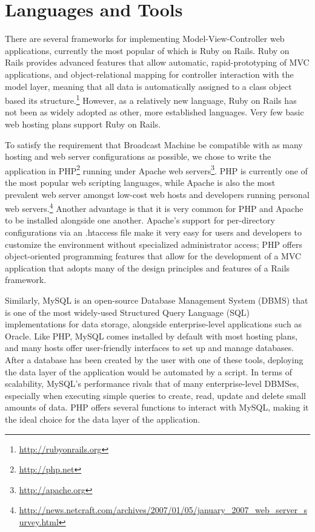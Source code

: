 \documentclass[a4paper,12pt]{report}
\begin{document}
\section{Languages and Tools}
There are several frameworks for implementing Model-View-Controller web applications, currently the most popular of which is Ruby on Rails. Ruby on Rails provides advanced features that allow automatic, rapid-prototyping of MVC applications, and object-relational mapping for controller interaction with the model layer, meaning that all data is automatically assigned to a class object based its structure.\footnote{\url{http://rubyonrails.org}} However, as a relatively new language, Ruby on Rails has not been as widely adopted as other, more established languages. Very few basic web hosting plans support Ruby on Rails. 

To satisfy the requirement that Broadcast Machine be compatible with as many hosting and web server configurations as possible, we chose to write the application in PHP\footnote{\url{http://php.net}} running under Apache web servers\footnote{\url{http://apache.org}}. PHP is currently one of the most popular web scripting languages, while Apache is also the most prevalent web server amongst low-cost web hosts and developers running personal web servers.\footnote{\url{http://news.netcraft.com/archives/2007/01/05/january\_2007\_web\_server\_survey.html}}
Another advantage is that it is very common for PHP and Apache to be installed alongside one another. Apache's support for per-directory configurations via an .htaccess file make it very easy for users and developers to customize the environment without specialized administrator access; PHP offers object-oriented programming features that allow for the development of a MVC application that adopts many of the design principles and features of a Rails framework.

Similarly, MySQL is an open-source Database Management System (DBMS) that is one of the most widely-used Structured Query Language (SQL) implementations for data storage, alongside enterprise-level applications such as Oracle. Like PHP, MySQL comes installed by default with most hosting plans, and many hosts offer user-friendly interfaces to set up and manage databases. After a database has been created by the user with one of these tools, deploying the data layer of the application would be automated by a script. In terms of scalability, MySQL's performance rivals that of many enterprise-level DBMSes, especially when executing simple queries to create, read, update and delete small amounts of data. PHP offers several functions to interact with MySQL, making it the ideal choice for the data layer of the application.
\end{document}
